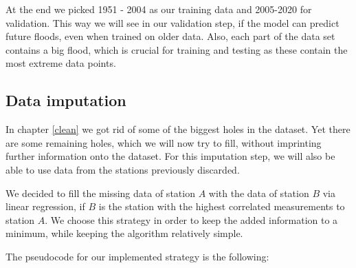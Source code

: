 \documentclass{article}
\begin{document}
At the end we picked 1951 - 2004 as our training data and 2005-2020 for
validation. This way we will see in our validation step, if the model can
predict future floods, even when trained on older data. Also, each part of the
data set contains a big flood, which is crucial for training and testing as
these contain the most extreme data points.

\subsection{Data imputation}\label{imputation}

In chapter \ref{clean} we got rid of some of the biggest holes in the dataset.
Yet there are some remaining holes, which we will now try to fill, without
imprinting further information onto the dataset. For this imputation step, we
will also be able to use data from the stations previously discarded.

We decided to fill the missing data of station $A$ with the data of station
$B$ via linear regression, if $B$ is the station with the highest correlated
measurements to station $A$. We choose this strategy in order to keep the
added information to a minimum, while keeping the algorithm relatively simple.

The pseudocode for our implemented strategy is the following:
\end{document}
